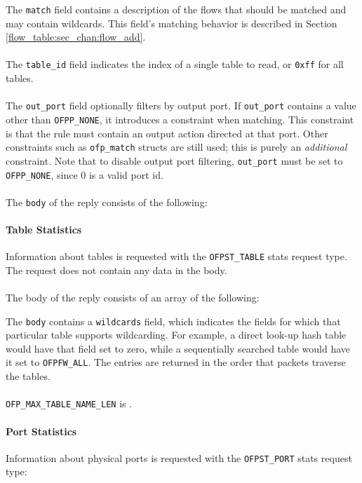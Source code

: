 
The \verb|match| field contains a description of the flows that should be matched and may contain wildcards.  This field's matching behavior is described in Section \ref{flow_table:sec_chan:flow_add}.
\\\\
The \verb|table_id| field indicates the index of a single table to read, or \verb|0xff| for all tables.
\\\\
The \verb|out_port| field optionally filters by output port.  If \verb|out_port| contains a value other than \verb|OFPP_NONE|, it introduces a constraint when matching.  This constraint is that the rule must contain an output action directed at that port.  Other constraints such as \verb|ofp_match| structs are still used; this is purely an \emph{additional} constraint.  Note that to disable output port filtering, \verb|out_port| must be set to \verb|OFPP_NONE|, since 0 is a valid port id. 
\\\\
The \verb|body| of the reply consists of the following:

 

\paragraph{Table Statistics}
Information about tables is requested with the \verb|OFPST_TABLE| stats request type.  The request does not contain any data in the body.
\\\\
The body of the reply consists of an array of the following:


The \verb|body| contains a \verb|wildcards| field, which indicates the fields for which that particular table supports wildcarding. For example, a direct look-up hash table would have that field set to zero, while a sequentially searched table would have it set to \verb|OFPFW_ALL|. The entries are returned in the order that packets traverse the tables. 
\\\\
\verb|OFP_MAX_TABLE_NAME_LEN| is .

\paragraph{Port Statistics}
Information about physical ports is requested with the \verb|OFPST_PORT| stats request type:

